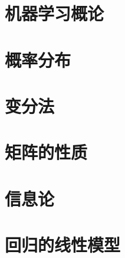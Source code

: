 \chapter{机器学习概论}
%

%
%

\chapter{概率分布}






\chapter{变分法}

\chapter{矩阵的性质}

\chapter{信息论}

\chapter{回归的线性模型}







